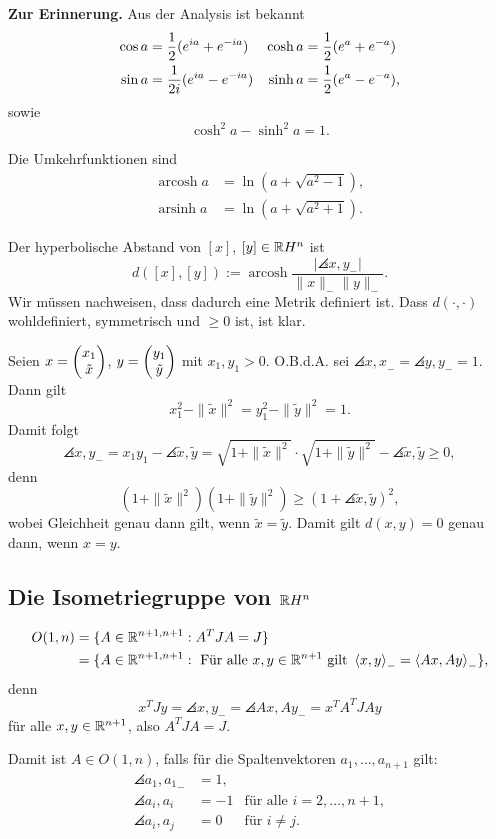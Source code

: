 \textbf{Zur Erinnerung.} Aus der Analysis ist bekannt
\begin{align*}
  \cos a &= \frac{1}{2} (e^{ia} + e^{-ia}) & \cosh a &= \frac{1}{2} (e^a + e^{-a}) \\
  \sin a &= \frac{1}{2i} (e^{ia} - e^{-ia}) & \sinh a &= \frac{1}{2} (e^a - e^{-a}),
\end{align*}
sowie
\[ \cosh^2 a - \sinh^2 a = 1. \]

Die Umkehrfunktionen sind
\begin{align*}
  \operatorname{arcosh} a &= \ln( a + \sqrt{a^2 - 1}), \\
  \operatorname{arsinh} a &= \ln( a + \sqrt{a^2 + 1}).
\end{align*}

\begin{defn*}
  Der hyperbolische Abstand von $[x]$, $[y] \in \mathbb{R} H^n$ ist
  \[ d([x],[y]) := \operatorname{arcosh} \frac{|\angles{x,y}_-|}{\|x\|_- \|y\|_-}.\]
  Wir müssen nachweisen, dass dadurch eine Metrik definiert ist. Dass $d(\cdot, \cdot)$ wohldefiniert, symmetrisch und $\ge 0$ ist, ist klar.

  Seien $x =\begin{pmatrix}x_1 \\ \tilde{x}\end{pmatrix}$, $y =\begin{pmatrix}y_1 \\ \tilde{y}\end{pmatrix}$ mit $x_1, y_1
  > 0$. O.B.d.A. sei $\angles{x,x}_- = \angles{y,y}_- = 1$. Dann gilt
  \[ x_1^2 - \| \tilde{x} \|^2 = y_1^2 - \| \tilde{y} \|^2 = 1. \]
  Damit folgt
  \[ \angles{x,y}_- = x_1 y_1 - \angles{\tilde{x},\tilde{y}} =\sqrt{1 + \|
      \tilde{x} \|^2} \cdot \sqrt{1 + \| \tilde{y} \|^2} -
    \angles{\tilde{x},\tilde{y}} \ge 0,\]
  denn
  \[ (1+\|\tilde{x}\|^2) (1+\|\tilde{y}\|^2) \ge ( 1 +
    \angles{\tilde{x},\tilde{y}})^2, \]
  wobei Gleichheit genau dann gilt, wenn $\tilde{x} = \tilde{y}$. Damit gilt
  $d(x,y) = 0$ genau dann, wenn $x = y$.
\end{defn*}

\subsection{Die Isometriegruppe von \texorpdfstring{$\mathbb{R} H^n$}{RH2}}
\begin{defn*}
  \begin{align*}
    O(1,n) 
    &= \{ A \in \mathbb{R}^{n+1,n+1} : A^T J A = J \} \\
    &= \{ A \in \mathbb{R}^{n+1,n+1} : \text{ Für alle $x,y \in \mathbb{R}^{n+1}$ gilt } 
      \left\langle x,y \right\rangle_- = \left\langle Ax,Ay \right\rangle_- \},
  \end{align*}
  denn
  \[x^T J y = \angles{x,y}_- = \angles{Ax,Ay}_- = x^T A^T J A y\]
  für alle $x,y \in \mathbb{R}^{n+1}$, also $A^T J  A = J$.

  Damit ist $A \in O(1,n)$, falls für die Spaltenvektoren $a_1, \ldots, a_{n+1}$
  gilt:
  \begin{align*}
    \angles{a_1, a_1}_- &= 1, \\
    \angles{a_i, a_i} &= -1 & \text{für alle } i = 2, \ldots, n+1, \\
    \angles{a_i, a_j} &= 0 & \text{für } i \ne j.
  \end{align*}
\end{defn*}


